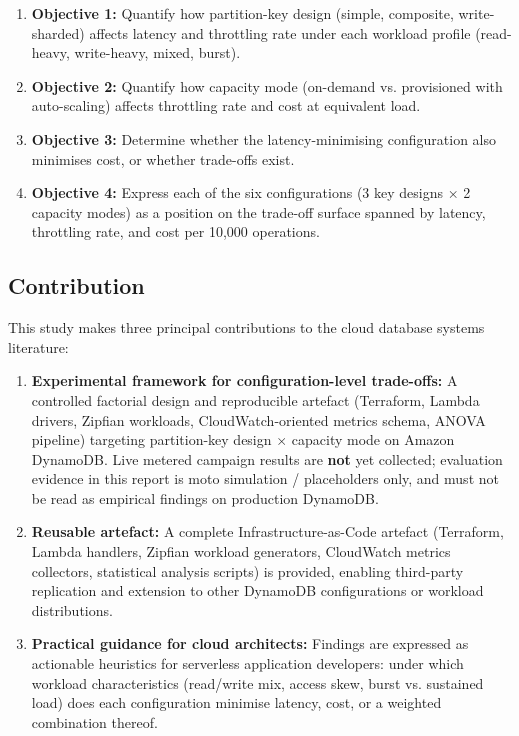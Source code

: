 \begin{enumerate}
    \item \textbf{Objective 1:} Quantify how partition-key design (simple, composite, write-sharded) affects latency and throttling rate under each workload profile (read-heavy, write-heavy, mixed, burst).
    \item \textbf{Objective 2:} Quantify how capacity mode (on-demand vs. provisioned with auto-scaling) affects throttling rate and cost at equivalent load.
    \item \textbf{Objective 3:} Determine whether the latency-minimising configuration also minimises cost, or whether trade-offs exist.
    \item \textbf{Objective 4:} Express each of the six configurations (3 key designs × 2 capacity modes) as a position on the trade-off surface spanned by latency, throttling rate, and cost per 10,000 operations.
\end{enumerate}

\subsection{Contribution}

This study makes three principal contributions to the cloud database systems literature:

\begin{enumerate}
    \item \textbf{Experimental framework for configuration-level trade-offs:} A controlled factorial design and reproducible artefact (Terraform, Lambda drivers, Zipfian workloads, CloudWatch-oriented metrics schema, ANOVA pipeline) targeting partition-key design $\times$ capacity mode on Amazon DynamoDB. Live metered campaign results are \textbf{not} yet collected; evaluation evidence in this report is moto simulation / placeholders only, and must not be read as empirical findings on production DynamoDB.
    \item \textbf{Reusable artefact:} A complete Infrastructure-as-Code artefact (Terraform, Lambda handlers, Zipfian workload generators, CloudWatch metrics collectors, statistical analysis scripts) is provided, enabling third-party replication and extension to other DynamoDB configurations or workload distributions.
    \item \textbf{Practical guidance for cloud architects:} Findings are expressed as actionable heuristics for serverless application developers: under which workload characteristics (read/write mix, access skew, burst vs. sustained load) does each configuration minimise latency, cost, or a weighted combination thereof.
\end{enumerate}

